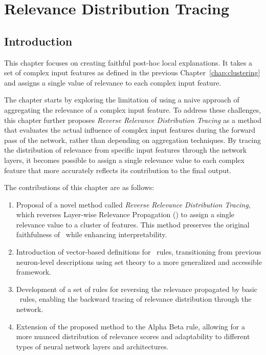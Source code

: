 \chapter{Relevance Distribution Tracing}
\label{chapter:revLRP}
\section{Introduction}

This chapter focuses on creating faithful post-hoc local explanations. It takes a set of complex input features as defined in the previous Chapter~\ref{chap:clustering} and assigns a single value of relevance to each complex input feature.

The chapter starts by exploring the limitation of using a naive approach of aggregating the relevance of a complex input feature. To address these challenges, this chapter further proposes \emph{Reverse Relevance Distribution Tracing} as a method that evaluates the actual influence of complex input features during the forward pass of the network, rather than depending on aggregation techniques. By tracing the distribution of relevance from specific input features through the network layers, it becomes possible to assign a single relevance value to each complex feature that more accurately reflects its contribution to the final output.

The contributions of this chapter are as follows: 
\begin{enumerate} 
\item Proposal of a novel method called \emph{Reverse Relevance Distribution Tracing}, which reverses Layer-wise Relevance Propagation (\LRP) to assign a single relevance value to a cluster of features. This method preserves the original faithfulness of \LRP\ while enhancing interpretability. 
\item Introduction of vector-based definitions for \LRP\ rules, transitioning from previous neuron-level descriptions using set theory to a more generalized and accessible framework. 
\item Development of a set of rules for reversing the relevance propagated by basic \LRP\ rules, enabling the backward tracing of relevance distribution through the network. 
\item Extension of the proposed method to the Alpha Beta rule, allowing for a more nuanced distribution of relevance scores and adaptability to different types of neural network layers and architectures. 

\end{enumerate}

